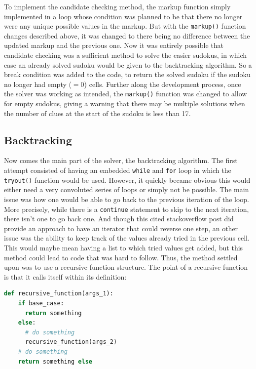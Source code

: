 \documentclass[12pt]{report} %
\begin{document}
To implement the candidate checking method, the markup function simply implemented in a loop whose condition was planned to be that there no longer were any unique possible values in the markup. But with the \texttt{markup()} function changes described above, it was changed to there being no difference between the updated markup and the previous one. Now it was entirely possible that candidate checking was a sufficient method to solve the easier sudokus, in which case an already solved sudoku would be given to the backtracking algorithm. So a break condition was added to the code, to return the solved sudoku if the sudoku no longer had empty ($=0$) cells. Further along the development process, once the solver was working as intended, the \texttt{markup()} function was changed to allow for empty sudokus, giving a warning that there may be multiple solutions when the number of clues at the start of the sudoku is less than 17\cite{cornell_sudoku2}.

\subsection{Backtracking}

Now comes the main part of the solver, the backtracking algorithm. The first attempt consisted of having an embedded \texttt{while} and \texttt{for} loop in which the \texttt{tryout()} function would be used. However, it quickly became obvious this would either need a very convoluted series of loops or simply not be possible. The main issue was how one would be able to go back to the previous iteration of the loop. More precisely, while there is a \texttt{continue} statement to skip to the next iteration, there isn't one to go back one\cite{stackoverflow_python_for_loop}. And though this cited stackoverflow post did provide an approach to have an iterator that could reverse one step, an other issue was the ability to keep track of the values already tried in the previous cell\cite{stackoverflow_python_for_loop}. This would maybe mean having a list to which tried values get added, but this method could lead to code that was hard to follow. Thus, the method settled upon was to use a recursive function structure. The point of a recursive function is that it calls itself within its definition:

\begin{lstlisting}[language=Python, caption = {Recursive function structure}]
  def recursive_function(args_1):
    if base_case:
      return something
    else:
      # do something
      recursive_function(args_2)
    # do something
    return something else
\end{lstlisting}
\end{document}
